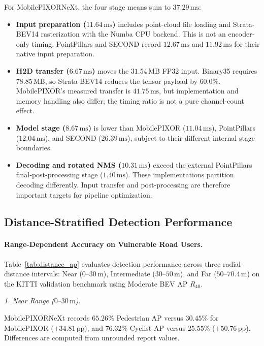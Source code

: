 For MobilePIXORNeXt, the four stage means sum to $37.29\,\text{ms}$:
\begin{itemize}
    \item \textbf{Input preparation ($11.64\,\text{ms}$)} includes point-cloud file loading and Strata-BEV14 rasterization with the Numba CPU backend. This is not an encoder-only timing. PointPillars and SECOND record $12.67\,\text{ms}$ and $11.92\,\text{ms}$ for their native input preparation.
    \item \textbf{H2D transfer ($6.67\,\text{ms}$)} moves the $31.54\,\text{MB}$ FP32 input. Binary35 requires $78.85\,\text{MB}$, so Strata-BEV14 reduces the tensor payload by $60.0\%$. MobilePIXOR's measured transfer is $41.75\,\text{ms}$, but implementation and memory handling also differ; the timing ratio is not a pure channel-count effect.
    \item \textbf{Model stage ($8.67\,\text{ms}$)} is lower than MobilePIXOR ($11.04\,\text{ms}$), PointPillars ($12.04\,\text{ms}$), and SECOND ($26.39\,\text{ms}$), subject to their different internal stage boundaries.
    \item \textbf{Decoding and rotated NMS ($10.31\,\text{ms}$)} exceed the external PointPillars final-post-processing stage ($1.40\,\text{ms}$). These implementations partition decoding differently. Input transfer and post-processing are therefore important targets for pipeline optimization.
\end{itemize}

\subsection{Distance-Stratified Detection Performance}
\label{sec:distance_stratified}

\paragraph{Range-Dependent Accuracy on Vulnerable Road Users.}
Table~\ref{tab:distance_ap} evaluates detection performance across three radial distance intervals: Near ($0\text{--}30\,\text{m}$), Intermediate ($30\text{--}50\,\text{m}$), and Far ($50\text{--}70.4\,\text{m}$) on the KITTI validation benchmark using Moderate BEV AP $R_{40}$.



\textit{1. Near Range ($0\text{--}30\,\text{m}$).}

MobilePIXORNeXt records $65.26\%$ Pedestrian AP versus $30.45\%$ for MobilePIXOR ($+34.81\,\text{pp}$), and $76.32\%$ Cyclist AP versus $25.55\%$ ($+50.76\,\text{pp}$). Differences are computed from unrounded report values.

